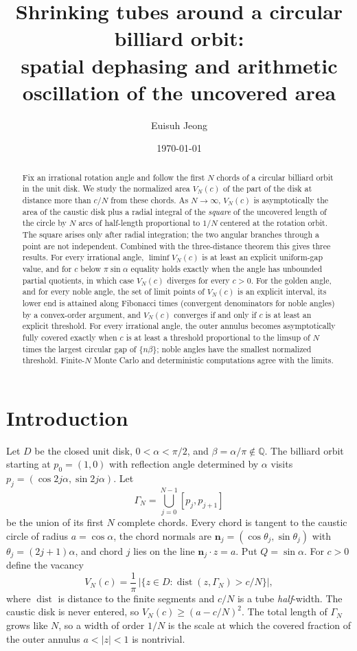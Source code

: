\documentclass[11pt]{amsart}
\title[Shrinking tubes around a circular billiard orbit]{Shrinking tubes around a circular billiard orbit:\\ spatial dephasing and arithmetic oscillation of the uncovered area}
\author{Euisuh Jeong}
\date{\today}
\theoremstyle{remark}
\DeclareMathOperator{\dist}{dist}
\begin{document}
\begin{abstract}
Fix an irrational rotation angle and follow the first $N$ chords of a circular
billiard orbit in the unit disk. We study the normalized area $V_N(c)$ of the part of
the disk at distance more than $c/N$ from these chords. As $N\to\infty$, $V_N(c)$ is
asymptotically the area of the caustic disk plus a radial integral of the \emph{square}
of the uncovered length of the circle by $N$ arcs of half-length proportional to $1/N$
centered at the rotation orbit. The square arises only after radial integration; the two
angular branches through a point are not independent. Combined with the three-distance
theorem this gives three results. For every irrational angle, $\liminf V_N(c)$ is at
least an explicit uniform-gap value, and for $c$ below $\pi\sin\alpha$ equality holds
exactly when the angle has unbounded partial quotients, in which case $V_N(c)$ diverges
for every $c>0$. For the golden angle, and for every noble angle, the set of limit points
of $V_N(c)$ is an explicit interval, its lower end is attained along Fibonacci times
(convergent denominators for noble angles) by a convex-order argument, and $V_N(c)$
converges if and only if $c$ is at least an explicit
threshold. For every irrational angle, the outer annulus becomes asymptotically fully
covered exactly when $c$ is at least a threshold proportional to the limsup of $N$ times
the largest circular gap of $\{n\beta\}$; noble angles have the smallest normalized
threshold. Finite-$N$ Monte Carlo and deterministic computations agree with the limits.
\end{abstract}

\maketitle

\section{Introduction}\label{sec:intro}

Let $D$ be the closed unit disk, $0<\alpha<\pi/2$, and $\beta=\alpha/\pi\notin\mathbb Q$.
The billiard orbit starting at $p_0=(1,0)$ with reflection angle determined by $\alpha$
visits $p_j=(\cos 2j\alpha,\sin 2j\alpha)$. Let
\[
\Gamma_N=\bigcup_{j=0}^{N-1}[p_j,p_{j+1}]
\]
be the union of its first $N$ complete chords. Every chord is tangent to the caustic
circle of radius $a=\cos\alpha$, the chord normals are $\mathbf n_j=(\cos\theta_j,\sin\theta_j)$
with $\theta_j=(2j+1)\alpha$, and chord $j$ lies on the line $\mathbf n_j\cdot z=a$. Put
$Q=\sin\alpha$. For $c>0$ define the vacancy
\[
V_N(c)=\frac{1}{\pi}\,\bigl|\{z\in D:\dist(z,\Gamma_N)>c/N\}\bigr|,
\]
where $\dist$ is distance to the finite segments and $c/N$ is a tube \emph{half}-width.
The caustic disk is never entered, so $V_N(c)\ge (a-c/N)^2$. The total length of
$\Gamma_N$ grows like $N$, so a width of order $1/N$ is the scale at which the covered
fraction of the outer annulus $a<|z|<1$ is nontrivial.
\end{document}
